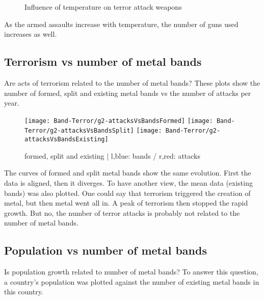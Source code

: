 \newpage

\begin{figure}[!ht]
\centering
    \qquad
    \qquad
    \qquad
    \qquad
    \qquad
\caption{Influence of temperature on terror attack weapons}
\label{fig:example subfigure}
\end{figure}

As the armed assaults increase with temperature, the number of guns used increases as well.


\subsection{Terrorism vs number of metal bands}
Are acts of terrorism related to the number of metal bands? These plots show the number of formed, split and existing metal bands vs the number of attacks per year.

\begin{figure}[hbt!]
	\texttt{[image: Band-Terror/g2-attacksVsBandsFormed]}
	\centering
	\texttt{[image: Band-Terror/g2-attacksVsBandsSplit]}
	\texttt{[image: Band-Terror/g2-attacksVsBandsExisting]}
	\caption{formed, split and existing | l,blue: bands / r,red: attacks}
\end{figure}

The curves of formed and split metal bands show the same evolution. First the data is aligned, then it diverges. To have another view, the mean data (existing bands) was also plotted. One could say that terrorism triggered the creation of metal, but then metal went all in. A peak of terrorism then stopped the rapid growth. But no, the number of terror attacks is probably not related to the number of metal bands.


\subsection{Population vs number of metal bands}
Is population growth related to number of metal bands? To answer this question, a country's population was plotted against the number of existing metal bands in this country.

